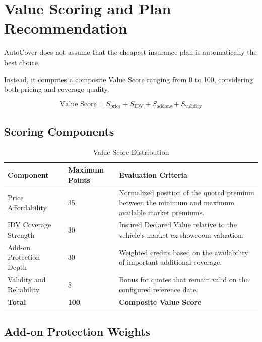 \documentclass[11pt,a4paper]{article}
\begin{document}

\section{Value Scoring and Plan Recommendation}

AutoCover does not assume that the cheapest insurance plan
is automatically the best choice.

Instead, it computes a composite Value Score ranging from
0 to 100, considering both pricing and coverage quality.

\[
\boxed{
\text{Value Score}
=
S_{\text{price}}
+
S_{\text{IDV}}
+
S_{\text{addons}}
+
S_{\text{validity}}
}
\]

\subsection{Scoring Components}

\begin{table}[H]
\centering
\caption{Value Score Distribution}
\begin{tabularx}{\textwidth}{L{3.4cm}C{2cm}Y}
\toprule
\textbf{Component} &
\textbf{Maximum Points} &
\textbf{Evaluation Criteria} \\
\midrule

Price Affordability &
35 &
Normalized position of the quoted premium between the
minimum and maximum available market premiums. \\

IDV Coverage Strength &
30 &
Insured Declared Value relative to the vehicle's
market ex-showroom valuation. \\

Add-on Protection Depth &
30 &
Weighted credits based on the availability of
important additional coverage. \\

Validity and Reliability &
5 &
Bonus for quotes that remain valid on the configured
reference date. \\

\midrule
\textbf{Total} & \textbf{100} & \textbf{Composite Value Score} \\
\bottomrule
\end{tabularx}
\end{table}

\subsection{Add-on Protection Weights}
\end{document}
